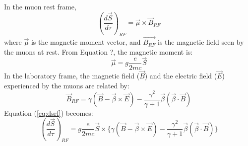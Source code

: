 \documentclass{outhesis}
\begin{document}
In the muon rest frame, 
\begin{equation}
\label{eq:dsrf}
\left(\frac{d \overrightarrow{S}}{d\tau}\right)_{RF} = \overrightarrow{\mu} \times \overrightarrow{B}_{RF}
\end{equation}
where $\overrightarrow{\mu}$ is the magnetic moment vector, and $\overrightarrow{B_{RF}}$ is the magnetic field seen by the muons at rest. From Equation ?, the magnetic moment is:
\begin{equation}
\overrightarrow{\mu} = g\frac{e}{2mc}\overrightarrow{S}
\end{equation}
In the laboratory frame, the magnetic field ($\overrightarrow{B}$) and the electric field ($\overrightarrow{E}$) experienced by the muons are related by: 
\begin{equation}
\label{eq:B}
\overrightarrow{B}_{RF} = \gamma \left(\overrightarrow{B}-\overrightarrow{\beta}\times\overrightarrow{E} \right) 
- \frac{\gamma^2}{\gamma+1}\overrightarrow{\beta}\left(\overrightarrow{\beta} \cdot \overrightarrow{B}\right)
\end{equation}
Equation (\ref{eq:dsrf}) becomes:
\begin{equation}
\label{eq:dsrf2}
\left(\frac{d \overrightarrow{S}}{d\tau}\right)_{RF} = g\frac{e}{2mc}\overrightarrow{S} \times \{\gamma \left(\overrightarrow{B}-\overrightarrow{\beta}\times\overrightarrow{E} \right)
- \frac{\gamma^2}{\gamma+1}\overrightarrow{\beta}\left(\overrightarrow{\beta} \cdot \overrightarrow{B}\right)\}
\end{equation}
\end{document}
